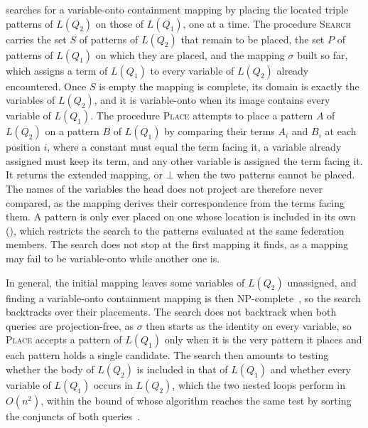  searches for a variable-onto containment mapping by placing the located triple patterns of $L(Q_2)$ on those of $L(Q_1)$, one at a time.
The procedure \textsc{Search} carries the set $S$ of patterns of $L(Q_2)$ that remain to be placed, the set $P$ of patterns of $L(Q_1)$ on which they are placed, and the mapping $\sigma$ built so far, which assigns a term of $L(Q_1)$ to every variable of $L(Q_2)$ already encountered.
Once $S$ is empty the mapping is complete, its domain is exactly the variables of $L(Q_2)$, and it is variable-onto when its image contains every variable of $L(Q_1)$.
The procedure \textsc{Place} attempts to place a pattern $A$ of $L(Q_2)$ on a pattern $B$ of $L(Q_1)$ by comparing their terms $A_i$ and $B_i$ at each position $i$, where a constant must equal the term facing it, a variable already assigned must keep its term, and any other variable is assigned the term facing it.
It returns the extended mapping, or $\bot$ when the two patterns cannot be placed.
The names of the variables the head does not project are therefore never compared, as the mapping derives their correspondence from the terms facing them.
A pattern is only ever placed on one whose location is included in its own (), which restricts the search to the patterns evaluated at the same federation members.
The search does not stop at the first mapping it finds, as a mapping may fail to be variable-onto while another one is.

In general, the initial mapping leaves some variables of $L(Q_2)$ unassigned, and finding a variable-onto containment mapping is then NP-complete~\cite{Chaudhuri1993}, so the search backtracks over their placements.
The search does not backtrack when both queries are projection-free, as $\sigma$ then starts as the identity on every variable, so \textsc{Place} accepts a pattern of $L(Q_1)$ only when it is the very pattern it places and each pattern holds a single candidate.
The search then amounts to testing whether the body of $L(Q_2)$ is included in that of $L(Q_1)$ and whether every variable of $L(Q_1)$ occurs in $L(Q_2)$, which the two nested loops perform in $O(n^2)$, within the bound of  whose algorithm reaches the same test by sorting the conjuncts of both queries~\cite[Remark~1]{Afrati2010}.

